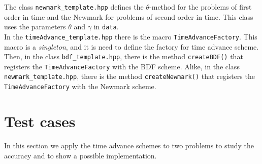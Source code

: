 \documentclass[english,a4paper]{article}
\begin{document}
  The class
  \verb"newmark_template.hpp"
  defines the $\theta$-method for
  the problems of first order in
  time and the Newmark for problems
  of  second order in time. This
  class uses the parameters $\theta$
  and $\gamma$  in \verb"data". \\

In the
\verb"timeAdvance_template.hpp"
there is the macro
\verb"TimeAdvanceFactory".
This macro is a {\sl singleton}, and
it is need to define the factory for
time advance scheme.
Then, in the class \verb"bdf_template.hpp",
there is the method
\verb"createBDF()" that registers
the \verb"TimeAdvanceFactory" with
the BDF scheme.  Alike,  in the class \verb"newmark_template.hpp",
there is the method
\verb"createNewmark()" that registers
the \verb"TimeAdvanceFactory" with
the Newmark scheme.
\section{Test cases}
In this section we apply the time advance schemes to two problems to study the accuracy  and to show a
possible implementation.
\end{document}
